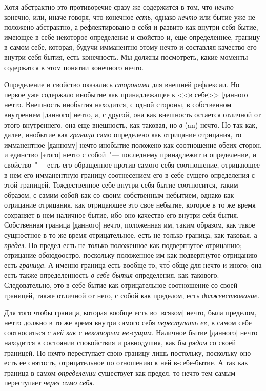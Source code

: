 Хотя абстрактно это противоречие сразу же содержится
в том, что \emph{нечто} конечно, или, иначе говоря, что
конечное \emph{есть}, однако \emph{нечто} или бытие уже не положено
абстрактно, а рефлектировано в себя и развито как внутри-себя-бытие,
имеющее в себе некоторое определение и
свойство и, еще определеннее, границу в самом себе, которая,
будучи имманентно этому нечто и составляя качество
его внутри-себя-бытия, есть конечность. Мы должны посмотреть,
какие моменты содержатся в этом понятии конечного
нечто.

Определение и свойство оказались \emph{сторонами} для
внешней рефлексии. Но первое уже содержало инобытие
как принадлежащее к <<в себе>> [данного] нечто. Внешность
инобытия находится, с одной стороны, в собственном
внутреннем [данного] нечто, а, с другой, она как
внешность остается отличной от этого внутреннего, она
еще внешность, как таковая, но \emph{в} (an) нечто. Но так как,
далее, инобытие как \emph{граница} само определено как отрицание
отрицания, то имманентное [данному] нечто инобытие
положено как соотношение обеих сторон, и единство
[этого] нечто с собой~"--- последнему принадлежит и
определение, и свойство~"--- есть его обращенное против
самого себя соотношение, отрицающее в нем его имманентную
границу соотнесением его в-себе-сущего определения
с этой границей. Тождественное себе внутри-себя-бытие
соотносится, таким образом, с самим собой как со
своим собственным небытием, однако как отрицание отрицания,
как отрицающее это свое небытие, которое в то
же время сохраняет в нем наличное бытие, ибо оно качество
его внутри-себя-бытия. Собственная граница [данного]
нечто, положенная им, таким образом, как такое сущностное
в то же время отрицательное, есть не только
граница, как таковая, а \emph{предел}. Но предел есть не только
положенное как подвергнутое отрицанию; отрицание
обоюдоостро, поскольку положенное им как подвергнутое
отрицанию есть \emph{граница}. А именно граница есть вообще
то, чт\'о обще для нечто и иного; она есть также определенность
\emph{в-себе-бытия} определения, как такового. Следовательно,
это в-себе-бытие как отрицательное соотношение
со своей границей, также отличной от него, с собой
как пределом, есть \emph{долженствование}.

Для того чтобы граница, которая вообще есть во [всяком]
нечто, была пределом, нечто должно в то же время
внутри самого себя \emph{переступать ее}, в самом себе соотноситься
\emph{с ней как с некоторым не-сущим}. Наличное бытие
[данного] нечто находится в состоянии спокойствия и равнодушия,
как бы \emph{рядом} со своей границей. Но нечто переступает
свою границу лишь постольку, поскольку оно
есть ее снятость, отрицательное по отношению к ней в-себе-бытие.
А так как граница в самом \emph{определении} существует
как предел, то нечто тем самым переступает
\emph{через само себя}.

